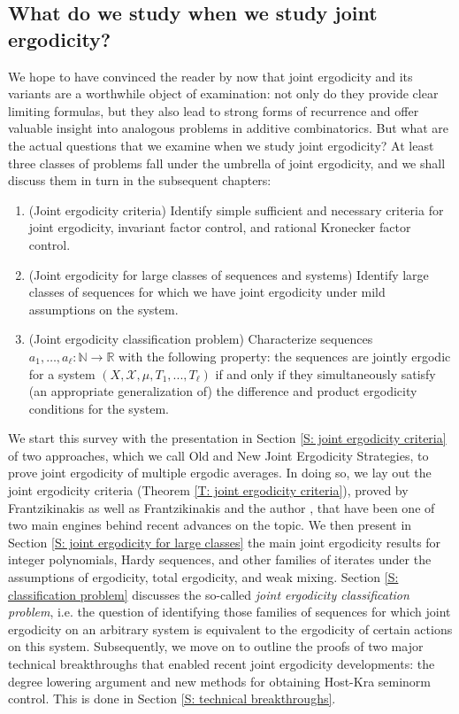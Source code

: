 \documentclass[11pt]{amsart}
\theoremstyle{definition}
\newcommand{\N}{{\mathbb N}}
\newcommand{\R}{{\mathbb R}}
\newcommand{\CK}{{\mathcal K}}
\newcommand{\CX}{{\mathcal X}}
\newcommand{\1}{{\mathbf{1}}}
\newcommand{\Krat}{{\CK_{\text{\rm rat}}}}
\newcommand{\BK}[1]{{\color{Apricot}{{#1}}}}
\begin{document}

\subsection{What do we study when we study joint ergodicity?}
We hope to have convinced the reader by now that joint ergodicity and its variants are a worthwhile object of examination: not only do they provide clear limiting formulas, but they also lead to strong forms of recurrence and offer valuable insight into analogous problems in additive combinatorics. But what are the actual questions that we examine when we study joint ergodicity? At least three classes of problems fall under the umbrella of joint ergodicity, and we shall discuss them in turn in the subsequent chapters:
\begin{enumerate}
    \item (Joint ergodicity criteria) Identify simple sufficient and necessary criteria for joint ergodicity, invariant factor control, and rational Kronecker factor control. %
    \item (Joint ergodicity for large classes of sequences and systems) Identify large classes of sequences for which we have joint ergodicity under mild assumptions on the system. 
    \item (Joint ergodicity classification problem) Characterize sequences $a_1, \ldots, a_\ell:\N\to\R$ with the following property: the sequences are jointly ergodic for a system $(X,\CX,\mu,T_1,...,T_\ell)$ if and only if they simultaneously satisfy (an appropriate generalization of) the difference and product ergodicity conditions for the system.
\end{enumerate}

We start this survey with the presentation in Section \ref{S: joint ergodicity criteria} of two approaches, which we call Old and New Joint Ergodicity Strategies, to prove joint ergodicity of multiple ergodic averages. In doing so, we lay out the joint ergodicity criteria (Theorem \ref{T: joint ergodicity criteria}), proved by Frantzikinakis \cite{Fr21} as well as Frantzikinakis and the author \cite{FrKu22a}, that have been one of two main engines behind recent advances on the topic. We then present in Section \ref{S: joint ergodicity for large classes} the main joint ergodicity results for integer polynomials, Hardy sequences, and other families of iterates under the assumptions of ergodicity, total ergodicity, and weak mixing. Section \ref{S: classification problem} discusses the so-called \emph{joint ergodicity classification problem}, i.e. the question of identifying those families of sequences for which joint ergodicity on an arbitrary system is equivalent to the ergodicity of certain actions on this system. Subsequently, we move on to outline the proofs of two major technical breakthroughs that enabled recent joint ergodicity developments: the degree lowering argument and new methods for obtaining Host-Kra seminorm control. This is done in Section \ref{S: technical breakthroughs}. 
\end{document}
